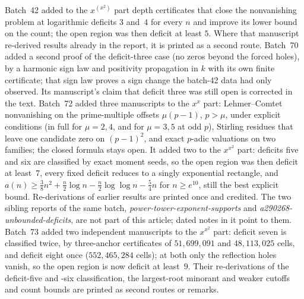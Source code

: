 \documentclass[11pt]{article}
\begin{document}
{Batch~42 added to the $x^{(x^2)}$ part depth certificates that close the
nonvanishing problem at logarithmic deficits $3$ and~$4$ for every $n$ and
improve its lower bound on the count; the open region was then deficit at least
$5$.  Where that manuscript re-derived results already in the report, it is
printed as a second route.  Batch~70 added a second proof of the
deficit-three case (no zeros beyond the forced holes), by a
harmonic sign law and positivity propagation in $k$ with its own finite
certificate; that sign law proves a sign change the batch-42 data had only
observed.  Its manuscript's claim that deficit three was still open is
corrected in the text.  Batch~72 added three manuscripts to the $x^x$ part:
Lehmer--Comtet nonvanishing on the prime-multiple offsets $\mu(p-1)$, $p>\mu$,
under explicit conditions (in full for $\mu=2,4$, and for $\mu=3,5$ at odd
$p$), Stirling residues that leave one candidate zero on $(p-1)^2$, and exact
$p$-adic valuations on two families; the closed formula stays open.  It added
two to the $x^{x^2}$ part: deficits five and six are classified by exact
moment seeds, so the open region was then deficit at least~$7$, every fixed
deficit reduces to a singly exponential rectangle, and
$a(n)\ge\frac38n^2+\frac n2\log n-\frac n2\log\log n-\frac54n$ for
$n\ge e^{10}$, still the best explicit bound.  Re-derivations of earlier
results are printed once and credited.  The two sibling reports of the same
batch, \emph{power-tower-exponent-supports} and
\emph{a290268-unbounded-deficits}, are not part of this article; dated notes
in it point to them.  Batch~73 added two independent manuscripts to the
$x^{x^2}$ part: deficit seven is classified twice, by three-anchor
certificates of $51{,}699{,}091$ and $48{,}113{,}025$ cells, and deficit
eight once ($552{,}465{,}284$ cells); at both only the reflection holes
vanish, so the open region is now deficit at least~$9$.  Their re-derivations
of the deficit-five and -six classification, the largest-root minorant and
weaker cutoffs and count bounds are printed as second routes or remarks.}
\end{document}
